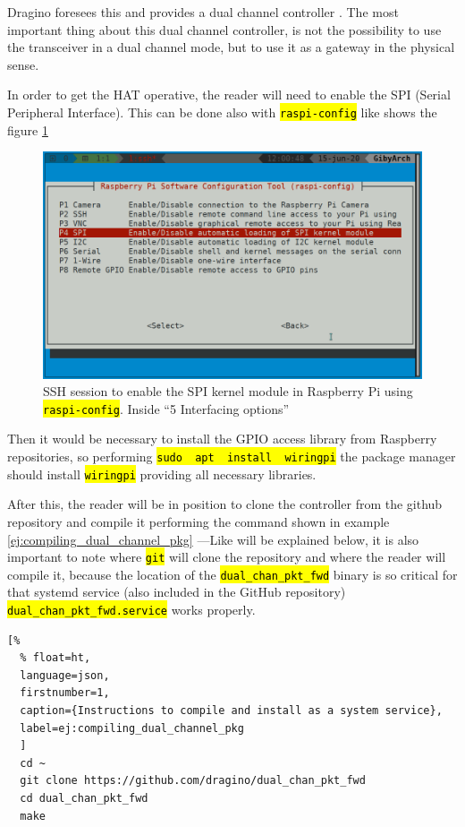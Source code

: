 \documentclass[11pt,a4paper,dvipsnames,twoside]{article}
\newcommand{\cmd}[1] {\hl{\texttt{#1}}}
\begin{document}
Dragino foresees this and provides a dual channel controller \cite{Dragino_DualChannelController_Rpi}. The most important thing about this dual channel controller, is not the possibility to use the transceiver in a dual channel mode, but to use it as a gateway in the physical sense.

In order to get the HAT operative, the reader will need to enable the SPI (Serial Peripheral Interface). This can be done also with \cmd{raspi-config} like shows the figure \ref{fig:EnablingSPI} 

\begin{figure}[ht]
  \centering
  \includegraphics[width=.9\textwidth]{../pictures/SPI_raspi-config.png}
  \caption{SSH session to enable the SPI kernel module in Raspberry Pi using \cmd{raspi-config}. Inside \enquote{5 Interfacing options}}
  \label{fig:EnablingSPI}
\end{figure}

Then it would be necessary to install the GPIO access library from Raspberry repositories, so performing \cmd{sudo\, apt\, install\, wiringpi} the package manager should install \cmd{wiringpi} providing all necessary libraries.

After this, the reader will be in position to clone the controller from the github repository \cite{Dragino_DualChannelController_Rpi} and compile it performing the command shown in example \ref{ej:compiling_dual_channel_pkg} ---Like will be explained below, it is also important to note where \cmd{git} will clone the repository and where the reader will compile it, because the location of the \cmd{dual\_chan\_pkt\_fwd} binary is so critical for that systemd service (also included in the GitHub repository) \cmd{dual\_chan\_pkt\_fwd.service} works properly.
 
\begin{lstlisting}[%
  % float=ht,
  language=json,
  firstnumber=1,
  caption={Instructions to compile and install as a system service},
  label=ej:compiling_dual_channel_pkg
  ]
  cd ~
  git clone https://github.com/dragino/dual_chan_pkt_fwd
  cd dual_chan_pkt_fwd
  make
\end{lstlisting}
\end{document}
